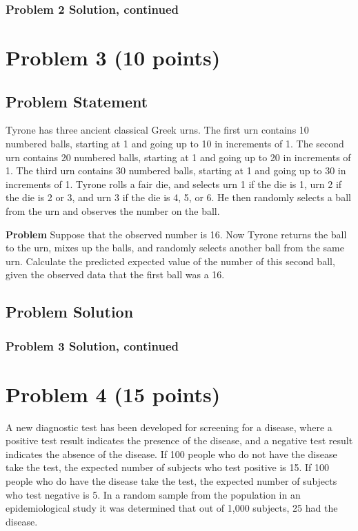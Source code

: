 \documentclass[12pt]{article}
\theoremstyle{definition}
\begin{document}
\newpage
\subsubsection*{Problem 2 Solution, continued}

\newpage
\section*{Problem 3 (10 points)}

\subsection*{Problem Statement}

Tyrone has three ancient classical Greek urns. The first urn contains 10 numbered balls, starting at 1 and going up to 10 in increments of 1. The second urn contains 20 numbered balls, starting at 1 and going up to 20 in increments of 1. The third urn contains 30 numbered balls, starting at 1 and going up to 30 in increments of 1. Tyrone rolls a fair die, and selects urn 1 if the die is 1, urn 2 if the die is 2 or 3, and urn 3 if the die is 4, 5, or 6. He then randomly selects a ball from the urn and observes the number on the ball.

\bigskip
\noindent
{\bf Problem} Suppose that the observed number is 16. Now Tyrone returns the ball to the urn, mixes up the balls, and randomly selects another ball from the same urn. Calculate the predicted expected value of the number of this second ball, given the observed data that the first ball was a 16.

\subsection*{Problem Solution}

\newpage
\subsubsection*{Problem 3 Solution, continued}









\newpage
\section*{Problem 4 (15 points)}

A new diagnostic test has been developed for screening for a disease, where a positive test result indicates the presence of the disease, and a negative test result indicates the absence of the disease. If 100 people who do not have the disease take the test, the expected number of subjects who test positive is 15. If 100 people who do have the disease take the test, the expected number of subjects who test negative is 5. In a random sample from the population in an epidemiological study it was determined that out of 1,000 subjects, 25 had the disease.
\end{document}
